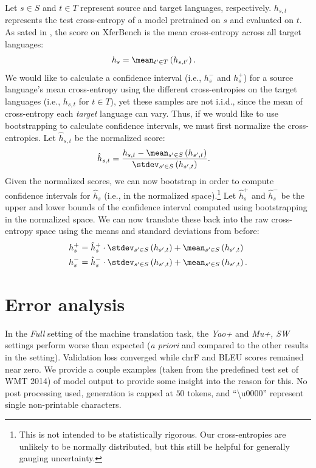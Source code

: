 Let $s \in S$ and $t \in T$ represent source and target languages, respectively.
$h_{s,t}$ represents the test cross-entropy of a model pretrained on $s$ and evaluated on $t$.
As sated in , the score on XferBench is the mean cross-entropy across all target languages:
\begin{align}
  h_{s} &= \mean_{t' \in T}\left( h_{s,t'}\right)
  .
\end{align}
We would like to calculate a confidence interval (i.e., $h^-_s$ and $h^+_s$) for a source language's mean cross-entropy using the different cross-entropies on the target languages (i.e., $h_{s,t}$ for $t \in T$), yet these samples are not i.i.d., since the mean of cross-entropy each \emph{target} language can vary.
Thus, if we would like to use bootstrapping to calculate confidence intervals, we must first normalize the cross-entropies.
Let $\hat h_{s,t}$ be the normalized score:
\begin{align}
  \hat h_{s,t} &= \frac{h_{s,t} - \mean_{s'\in S}\left(h_{s',t}\right)}{\stdev_{s'\in S}\left(h_{s',t}\right)}
  .
\end{align}
Given the normalized scores, we can now bootstrap in order to compute confidence intervals for $\hat h_s$ (i.e., in the normalized space).\footnote{This is not intended to be statistically rigorous. Our cross-entropies are unlikely to be normally distributed, but this still be helpful for generally gauging uncertainty.}
Let $\hat h^+_s$ and $\hat h^-_s$ be the upper and lower bounds of the confidence interval computed using bootstrapping in the normalized space.
We can now translate these back into the raw cross-entropy space using the means and standard deviations from before:
\begin{align}
  h^+_s &= \hat h^+_s \cdot \stdev_{s'\in S}\left(h_{s',t}\right) + \mean_{s'\in S}\left(h_{s',t}\right) \\
  h^-_s &= \hat h^-_s \cdot \stdev_{s'\in S}\left(h_{s',t}\right) + \mean_{s'\in S}\left(h_{s',t}\right)
  .
\end{align}

\section{Error analysis}
\unskip\label{sec:error-analysis}
In the \emph{Full} setting of the machine translation task, the \emph{Yao+} and \emph{Mu+, SW} settings perform worse than expected (\emph{a priori} and compared to the other results in the setting).
Validation loss converged while chrF and BLEU scores remained near zero.
We provide a couple examples (taken from the predefined test set of WMT 2014) of model output to provide some insight into the reason for this.
No post processing used, generation is capped at $50$ tokens, and ``\textbackslash{}u0000'' represent single non-printable characters.

